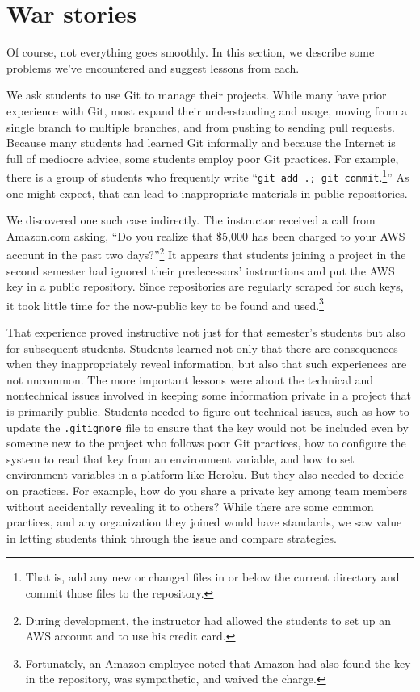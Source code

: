 \section{War stories}

Of course, not everything goes smoothly.  In this section,
we describe some problems we've encountered and suggest lessons from each.

We ask students to use Git to manage their projects.  While many
have prior experience with Git, most expand
their understanding and usage, moving
from a single branch to multiple branches, and from pushing
to sending pull requests.  Because many students had learned Git
informally and because the Internet is full of mediocre advice,
some students employ poor Git practices.  For example, there is a
group of students who frequently write ``\texttt{git add .; git
commit}.\footnote{That is, add any new or changed files in or below
the current directory and commit those files to the repository.}''
As one might expect, that can lead to inappropriate materials in
public repositories.

We discovered one such case indirectly.  The instructor received
a call from Amazon.com asking, ``Do you realize that \$5,000 has
been charged to your AWS account in the past two days?''\footnote{During
development, the instructor had allowed the students to set up an
AWS account and to use his credit card.}  It appears that students
joining a project in the second semester had ignored their predecessors'
instructions and put the AWS key in a public repository.  Since
repositories are regularly scraped for such
keys, it took little time for the now-public key to be found and
used.\footnote{Fortunately, an Amazon employee noted that Amazon
had also found the key in the repository, was sympathetic, and
waived the charge.}

That experience proved instructive not just for that semester's
students but also for subsequent students.  Students learned not
only that there are consequences when they inappropriately reveal
information, but also that such experiences are not uncommon.  The
more important lessons were about the technical and nontechnical
issues involved in keeping some information private in a project
that is primarily public.  Students needed to figure out technical
issues, such as how to update the \texttt{.gitignore} file to ensure
that the key would not be included even by someone new to the
project who follows poor Git practices, how to configure the system to read
that key from an environment variable, and how to set environment
variables in a platform like Heroku.  But they also needed to decide
on practices.  For example, how do you share a private key among
team members without accidentally revealing it to others?  While
there are some common practices, and any organization they joined
would have standards, we saw value in letting students think through
the issue and compare strategies.

